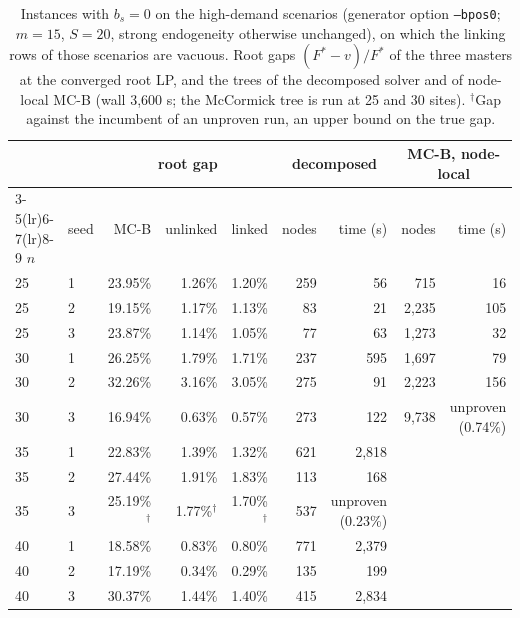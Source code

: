 \documentclass[11pt]{article}
\begin{document}
\begin{table}[ht]
\centering\small
\caption{Instances with $b_s = 0$ on the high-demand scenarios (generator option \texttt{--bpos0}; $m = 15$, $S = 20$,
strong endogeneity otherwise unchanged), on which the linking rows of those scenarios are vacuous. Root gaps
$(F^* - v)/F^*$ of the three masters at the converged root LP, and the trees of the decomposed solver and of node-local
\textsc{MC-B} (wall 3,600 s; the McCormick tree is run at 25 and 30 sites). $^\dagger$Gap against the incumbent of an
unproven run, an upper bound on the true gap.}
\label{tab:bpos0}
\begin{tabular}{ll rrr rr rr}
\toprule
& & \multicolumn{3}{c}{root gap} & \multicolumn{2}{c}{decomposed} & \multicolumn{2}{c}{\textsc{MC-B}, node-local}\\
\cmidrule(lr){3-5}\cmidrule(lr){6-7}\cmidrule(lr){8-9}
$n$ & seed & \textsc{MC-B} & unlinked & linked & nodes & time (s) & nodes & time (s)\\
\midrule
25 & 1 & 23.95\% & 1.26\% & 1.20\% & 259 & 56 & 715 & 16\\
25 & 2 & 19.15\% & 1.17\% & 1.13\% & 83 & 21 & 2,235 & 105\\
25 & 3 & 23.87\% & 1.14\% & 1.05\% & 77 & 63 & 1,273 & 32\\
30 & 1 & 26.25\% & 1.79\% & 1.71\% & 237 & 595 & 1,697 & 79\\
30 & 2 & 32.26\% & 3.16\% & 3.05\% & 275 & 91 & 2,223 & 156\\
30 & 3 & 16.94\% & 0.63\% & 0.57\% & 273 & 122 & 9,738 & unproven (0.74\%)\\
35 & 1 & 22.83\% & 1.39\% & 1.32\% & 621 & 2,818 &  & \\
35 & 2 & 27.44\% & 1.91\% & 1.83\% & 113 & 168 &  & \\
35 & 3 & 25.19\%$^\dagger$ & 1.77\%$^\dagger$ & 1.70\%$^\dagger$ & 537 & unproven (0.23\%) &  & \\
40 & 1 & 18.58\% & 0.83\% & 0.80\% & 771 & 2,379 &  & \\
40 & 2 & 17.19\% & 0.34\% & 0.29\% & 135 & 199 &  & \\
40 & 3 & 30.37\% & 1.44\% & 1.40\% & 415 & 2,834 &  & \\
\bottomrule
\end{tabular}
\end{table}
\end{document}
